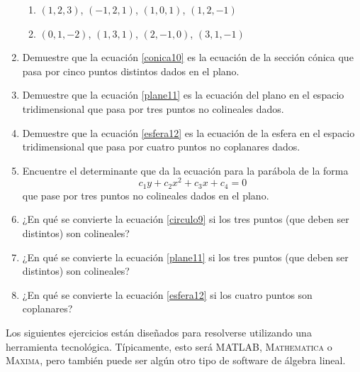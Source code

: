 \begin{enumerate}
\begin{enumerate}[label=\alph*)]
        \item $(1, 2, 3)$, $(-1, 2, 1)$, $(1, 0, 1)$, $(1, 2, -1)$
        \item $(0, 1, -2)$, $(1, 3, 1)$, $(2, -1, 0)$, $(3, 1, -1)$
    \end{enumerate}
    \item Demuestre que la ecuación \eqref{conica10} es la ecuación de la sección cónica que pasa por cinco puntos distintos dados en el plano.
    \item Demuestre que la ecuación \eqref{plane11} es la ecuación del plano en el espacio tridimensional que pasa por tres puntos no colineales dados.
    \item Demuestre que la ecuación \eqref{esfera12} es la ecuación de la esfera en el espacio tridimensional que pasa por cuatro puntos no coplanares dados.
    \item Encuentre el determinante que da la ecuación para la parábola de la forma
    $$c_1y + c_2x^2 + c_3x + c_4 = 0$$
    que pase por tres puntos no colineales dados en el plano.
    \item ¿En qué se convierte la ecuación \eqref{circulo9} si los tres puntos (que deben ser distintos) son colineales?
    \item ¿En qué se convierte la ecuación \eqref{plane11} si los tres puntos (que deben ser distintos) son colineales?
    \item ¿En qué se convierte la ecuación \eqref{esfera12} si los cuatro puntos son coplanares?
\end{enumerate}
Los siguientes ejercicios están diseñados para resolverse utilizando una herramienta tecnológica. Típicamente, esto será \textsc{MATLAB}, \textsc{Mathematica} o \textsc{Maxima}, pero también puede ser algún otro tipo de software de álgebra lineal.
